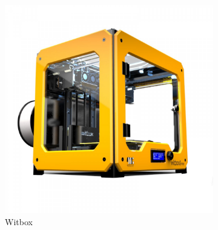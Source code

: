 \begin{figure}[H]
                      \centering
                        \begin{subfigure}[b]{0.3\textwidth}
                            \centering
                            \includegraphics[width=\linewidth]{images/Witbox.jpg}
                            \caption{Witbox}
                            \label{fig:estado_witbox}
                        \end{subfigure}
                        ~
                        \begin{subfigure}[b]{0.3\textwidth}
                                \centering

\end{subfigure}
\end{figure}
